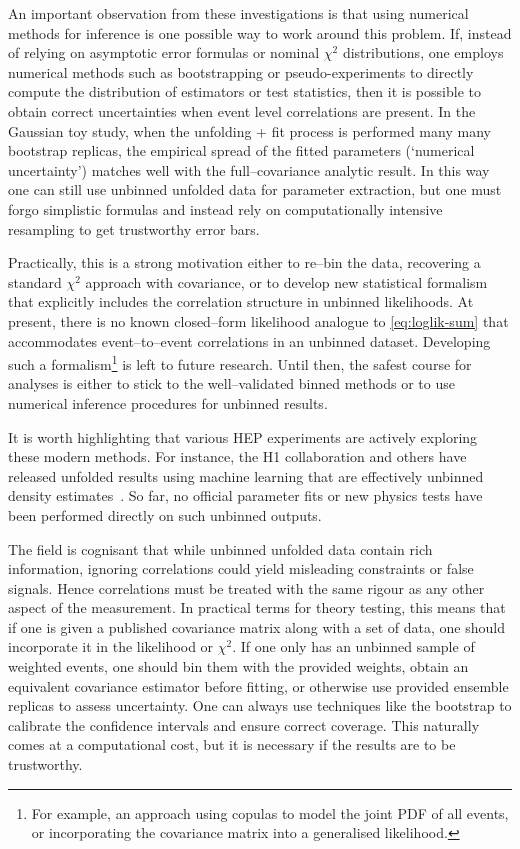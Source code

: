     An important observation from these investigations is that using numerical methods for inference is one possible way to work around this problem.
    If, instead of relying on asymptotic error formulas or nominal $\chi^2$ distributions, one employs numerical methods such as bootstrapping or pseudo-experiments to directly compute the distribution of estimators or test statistics, then it is possible to obtain correct uncertainties when event level correlations are present.
    In the Gaussian toy study, when the unfolding + fit process is performed many many bootstrap replicas, the empirical spread of the fitted parameters (`numerical uncertainty') matches well with the full--covariance analytic result.
    In this way one can still use unbinned unfolded data for parameter extraction, but one must forgo simplistic formulas and instead rely on computationally intensive resampling to get trustworthy error bars.
    
    Practically, this is a strong motivation either to re--bin the data, recovering a standard $\chi^2$ approach with covariance, or to develop new statistical formalism that explicitly includes the correlation structure in unbinned likelihoods.
    At present, there is no known closed--form likelihood analogue to \cref{eq:loglik-sum} that accommodates event--to--event correlations in an unbinned dataset.
    Developing such a formalism\footnote{For example, an approach using copulas to model the joint PDF of all events, or incorporating the covariance matrix into a generalised likelihood.} is left to future research.
    Until then, the safest course for analyses is either to stick to the well--validated binned methods or to use numerical inference procedures for unbinned results.

    It is worth highlighting that various HEP experiments are actively exploring these modern methods.
    For instance, the H1 collaboration and others have released unfolded results using machine learning that are effectively unbinned density estimates~\cite{H1:2021wkz}.
    So far, no official parameter fits or new physics tests have been performed directly on such unbinned outputs.
    
    The field is cognisant that while unbinned unfolded data contain rich information, ignoring correlations could yield misleading constraints or false signals.
    Hence correlations must be treated with the same rigour as any other aspect of the measurement.
    In practical terms for theory testing, this means that if one is given a published covariance matrix along with a set of data, one should incorporate it in the likelihood or $\chi^2$.
    If one only has an unbinned sample of weighted events, one should bin them with the provided weights, obtain an equivalent covariance estimator before fitting, or otherwise use provided ensemble replicas to assess uncertainty.
    One can always use techniques like the bootstrap to calibrate the confidence intervals and ensure correct coverage.
    This naturally comes at a computational cost, but it is necessary if the results are to be trustworthy.
    
